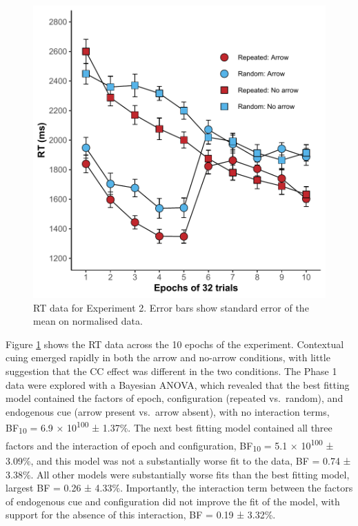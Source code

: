 \documentclass[
  man,floatsintext]{apa7}
\begin{document}
\begin{figure}

{\centering \includegraphics{CCC_ms1_files/figure-latex/Exp2-RT-figure-1} 

}

\caption{RT data for Experiment 2. Error bars show standard error of the mean on normalised data.}\label{fig:Exp2-RT-figure}
\end{figure}



Figure \ref{fig:Exp2-RT-figure} shows the RT data across the 10 epochs of the experiment. Contextual cuing emerged rapidly in both the arrow and no-arrow conditions, with little suggestion that the CC effect was different in the two conditions. The Phase 1 data were explored with a Bayesian ANOVA, which revealed that the best fitting model contained the factors of epoch, configuration (repeated vs.~random), and endogenous cue (arrow present vs.~arrow absent), with no interaction terms, BF\textsubscript{10} = 6.9 × 10\textsuperscript{100} ± 1.37\%. The next best fitting model contained all three factors and the interaction of epoch and configuration, BF\textsubscript{10} = 5.1 × 10\textsuperscript{100} ± 3.09\%, and this model was not a substantially worse fit to the data, BF = 0.74 ± 3.38\%. All other models were substantially worse fits than the best fitting model, largest BF = 0.26 ± 4.33\%. Importantly, the interaction term between the factors of endogenous cue and configuration did not improve the fit of the model, with support for the absence of this interaction, BF = 0.19 ± 3.32\%.
\end{document}
